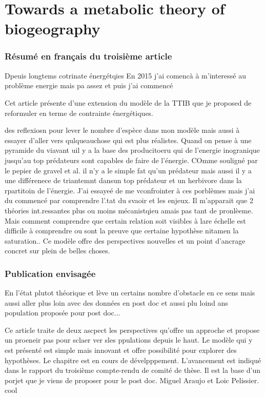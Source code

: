 \chapter{Towards a metabolic theory of biogeography}
\label{chap4}


\subsection{Résumé en français du troisième article}

Dpeuis longtems cotrinate énergétqies
En 2015 j'ai comencà à m'interessé au problème energie mais pa assez et puis j'ai commencé

Cet article présente d'une extension du modèle de la TTIB \citep{Gravel2011}
que je proposed de reformuler en terme de contrainte énergétiques.


des reflexiosn pour lever le nombre d'espèce dans mon modèle mais aussi à essayer d'aller vers qulqueauchose qui est plus réalistes.
Quand on pense à une pyramide du viavant uil y a la base des producitoeru qui de l'energie inogranique jusqu'au top prédateurs sont capables de faire de l'énergie.
COmme souligné par le pepier de gravel et al. il n'y a le simple fat qu'un prédateur mais aussi il y a une différenece de triantemnt dansun top prédateur et un herbivore dans la rpartitoin de l'énergie. J'ai essayeé de me vconfrointer à ces porblèmes mais j'ai du commencé par comprendre l'.tat du svaoir et les enjeux. Il m'apparait que 2 théories int.ressantes plus ou moins mécanistqieu amais pas tant de pronlèeme. Mais comment comprendre que certain relation soit visibles à lare échelle est difficile à comprendre ou sont la preuve que certaine hypothèse nitamen la saturation..
Ce modèle offre des perspectives nouvelles et un point d'ancrage concret sur plein de belles choses.



\subsection{Publication envisagée}

En l'état plutot théorique et lève un certains nombre d'obstacle en ce sens
mais aussi aller plus loin avec des données en post doc et aussi plu loind ans population
proposée pour post doc... 

Ce article traite de deux ascpect les perspectives qu'offre un approche et propose un proeneir pas pour sclaer ver sles ppulations depuis le haut.
Le modèle qui y est présenté est simple mais innovant et offre possibilité pour explorer des hypothèses.
Le chapitre est en cours de dévelpppement. L'avancement est indiqué dans le rapport du troisième compte-rendu de comité de thèse.
Il est la base d'un porjet que je viens de proposer pour le post doc.
Miguel Araujo et Loic Pelissier. cool

